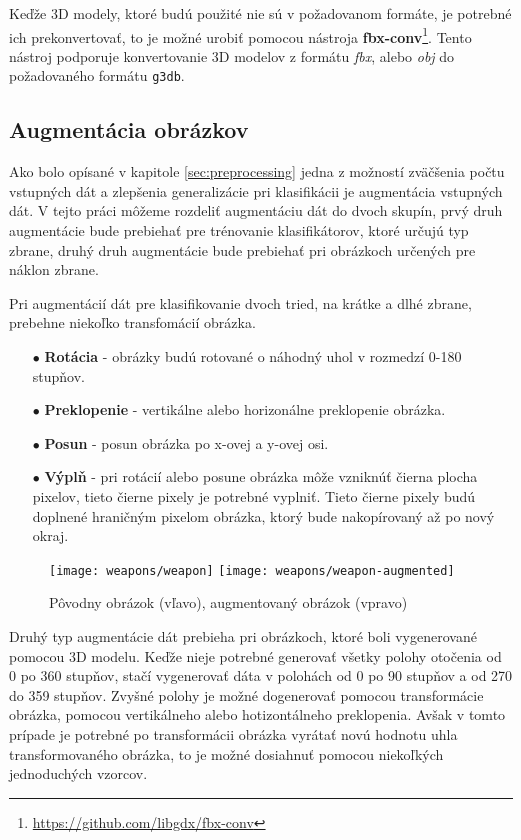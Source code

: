 Keďže 3D modely, ktoré budú použité nie sú v požadovanom formáte, je potrebné ich prekonvertovať, to je možné urobiť
    pomocou nástroja \textbf{fbx-conv}\footnote{\url{https://github.com/libgdx/fbx-conv}}.
Tento nástroj podporuje konvertovanie 3D modelov z formátu \textit{fbx}, alebo \textit{obj} do požadovaného formátu \texttt{g3db}.

\subsection{Augmentácia obrázkov}
\label{subsec:augmentacia}
Ako bolo opísané v kapitole \ref{sec:preprocessing} jedna z možností zväčšenia počtu vstupných dát a zlepšenia generalizácie pri klasifikácii je augmentácia vstupných dát.
V tejto práci môžeme rozdeliť augmentáciu dát do dvoch skupín, prvý druh augmentácie bude prebiehať pre trénovanie klasifikátorov, ktoré
    určujú typ zbrane, druhý druh augmentácie bude prebiehať pri obrázkoch určených pre náklon zbrane.

Pri augmentácií dát pre klasifikovanie dvoch tried, na krátke a dlhé zbrane, prebehne niekoľko transfomácií obrázka.
\begin{enumerate}
    \item[$\bullet$] \textbf{Rotácia} - obrázky budú rotované o náhodný uhol v rozmedzí 0-180 stupňov.
    \item[$\bullet$] \textbf{Preklopenie} - vertikálne alebo horizonálne preklopenie obrázka.
    \item[$\bullet$] \textbf{Posun} - posun obrázka po x-ovej a y-ovej osi.
    \item[$\bullet$] \textbf{Výplň} - pri rotácií alebo posune obrázka môže vzniknúť čierna plocha pixelov, tieto čierne pixely je potrebné vyplniť.
    Tieto čierne pixely budú doplnené hraničným pixelom obrázka, ktorý bude nakopírovaný až po nový okraj.
\end{enumerate}

\begin{figure}[H]
    \centering
    \texttt{[image: weapons/weapon]}
    \qquad
    \texttt{[image: weapons/weapon-augmented]}
    \caption{Pôvodny obrázok (vľavo), augmentovaný obrázok (vpravo)}
    \label{pic:imageAugmented}
\end{figure}

Druhý typ augmentácie dát prebieha pri obrázkoch, ktoré boli vygenerované pomocou 3D modelu.
Keďže nieje potrebné generovať všetky polohy otočenia od 0 po 360 stupňov, stačí vygenerovať dáta v polohách od 0 po 90 stupňov a od 270 do 359 stupňov.
Zvyšné polohy je možné dogenerovať pomocou transformácie obrázka, pomocou vertikálneho alebo hotizontálneho preklopenia.
Avšak v tomto prípade je potrebné po transformácii obrázka vyrátať novú hodnotu uhla transformovaného obrázka, to je možné dosiahnuť pomocou niekoľkých
    jednoduchých vzorcov.

